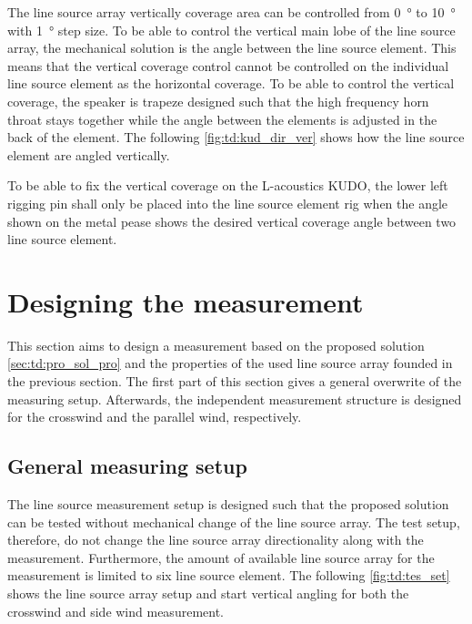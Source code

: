 The line source array vertically coverage area can be controlled from \SI{0}{\degree} to \SI{10}{\degree} with \SI{1}{\degree} step size. To be able to control the vertical main lobe of the line source array, the mechanical solution is the angle between the line source element. This means that the vertical coverage control cannot be controlled on the individual line source element as the horizontal coverage. To be able to control the vertical coverage, the speaker is trapeze designed such that the high frequency horn throat stays together while the angle between the elements is adjusted in the back of the element. The following \autoref{fig:td:kud_dir_ver} shows how the line source element are angled vertically.


To be able to fix the vertical coverage on the L-acoustics KUDO, the lower left rigging pin shall only be placed into the line source element rig when the angle shown on the metal pease shows the desired vertical coverage angle between two line source element.  


\section{Designing the measurement}\label{sec:des:des_mes}
This section aims to design a measurement based on the proposed solution \autoref{sec:td:pro_sol_pro} and the properties of the used line source array founded in the previous section. The first part of this section gives a general overwrite of the measuring setup. Afterwards, the independent measurement structure is designed for the crosswind and the parallel wind, respectively.


\subsection{General measuring setup}\label{sec:pro:test_setup}
The line source measurement setup is designed such that the proposed solution can be tested without mechanical change of the line source array. The test setup, therefore, do not change the line source array directionality along with the measurement. Furthermore, the amount of available line source array for the measurement is limited to six line source element. The following \autoref{fig:td:tes_set} shows the line source array setup and start vertical angling for both the crosswind and side wind measurement. 

